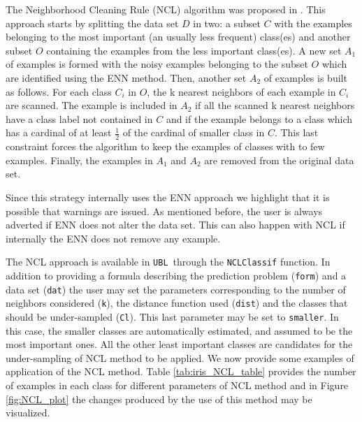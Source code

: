 \documentclass[10pt,a4paper]{article}\usepackage[]{graphicx}\usepackage[]{color}
\newcommand{\UBL}{\texttt{UBL}\ }
\begin{document}
The Neighborhood Cleaning Rule (NCL) algorithm was proposed in \cite{laurikkala2001improving}. This approach starts by splitting the data set $D$ in two: a subset $C$ with the examples belonging to the most important (an usually less frequent) class(es) and another subset $O$ containing the examples from the less important class(es). A new set $A_1$ of examples is formed with the noisy examples belonging to the subset $O$ which are identified using the ENN method.
Then, another set $A_2$ of examples is built as follows. For each class $C_i$ in $O$, the k nearest neighbors of each example in $C_i$ are scanned. The example is included in $A_2$ if all the scanned k nearest neighbors have a class label not contained in $C$ and if the example belongs to a class which has a cardinal of at least $\frac{1}{2}$ of the cardinal of smaller class in $C$. This last constraint forces the algorithm to keep the examples of classes with to few examples.
Finally, the examples in $A_1$ and $A_2$ are removed from the original data set.

Since this strategy internally uses the ENN approach we highlight that it is possible that warnings are issued. As mentioned before, the user is always adverted if ENN does not alter the data set. This can also happen with NCL if internally the ENN does not remove any example.

The NCL approach is available in \UBL through the \texttt{NCLClassif} function. In addition to providing a formula describing the prediction problem (\texttt{form}) and a data set (\texttt{dat}) the user may set the parameters corresponding to the number of neighbors considered (\texttt{k}), the distance function used (\texttt{dist}) and the classes that should be under-sampled (\texttt{Cl}). This last parameter may be set to \texttt{smaller}. In this case, the smaller classes are automatically estimated, and assumed to be the most important ones. All the other least important classes are candidates for the under-sampling of NCL method to be applied. We now provide some examples of application of the NCL method. Table \ref{tab:iris_NCL_table} provides the number of examples in each class for different parameters of NCL method and in Figure \ref{fig:NCL_plot} the changes produced by the use of this method may be visualized.
\end{document}

